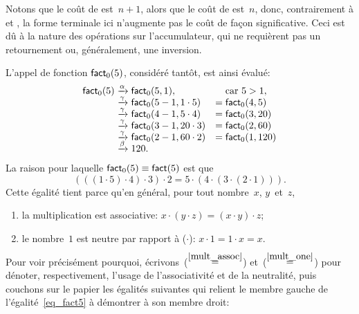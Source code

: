 Notons que le coût de  est~\(n+1\), alors que le
coût de  est~\(n\), donc, contrairement à
 et , la forme terminale ici n'augmente
pas le coût de façon significative. Ceci est dû à la nature des
opérations sur l'accumulateur, qui ne requièrent pas un retournement
ou, généralement, une inversion.

L'appel de fonction \(\textsf{fact}_0(5)\), considéré tantôt, est ainsi
évalué:
\begin{equation*}
\begin{array}{r@{\;}c@{\;}lc@{\;}l}
\fun{fact}_0(5)
& \xrightarrow{\smash[t]{\alpha}} & \fun{fact}_0(5,1), 
&& \text{car \(5 > 1\)},\\
& \xrightarrow{\smash[t]{\gamma}} & \fun{fact}_0(5-1,1 \cdot 5)
& = & \fun{fact}_0(4,5)\\
& \xrightarrow{\smash[t]{\gamma}} & \fun{fact}_0(4-1,5 \cdot 4)
& = & \fun{fact}_0(3,20)\\
& \xrightarrow{\smash[t]{\gamma}} & \fun{fact}_0(3-1,20 \cdot 3)
& = & \fun{fact}_0(2,60)\\
& \xrightarrow{\smash[t]{\gamma}} & \fun{fact}_0(2-1,60 \cdot 2)
& = & \fun{fact}_0(1,120)\\
& \xrightarrow{\smash[t]{\beta}} & 120.
\end{array}
\end{equation*}
La raison pour laquelle \(\textsf{fact}_0(5) \equiv \textsf{fact}(5)\) est
que
\begin{equation}
  (((1 \cdot 5) \cdot 4) \cdot 3) \cdot 2
= 5 \cdot (4 \cdot (3 \cdot (2 \cdot 1))).\label{eq_fact5}
\end{equation}
Cette égalité tient parce qu'en général, pour tout nombre~\(x\), \(y\)~et~\(z\),
\begin{enumerate}

\item \label{mult_assoc} la multiplication est associative: \(x \cdot
  (y \cdot z) = (x \cdot y) \cdot z\);

\item \label{mult_one} le nombre~\(1\) est neutre par rapport à
  (\(\cdot\)): \(x \cdot 1 = 1 \cdot x = x\).

\end{enumerate}
Pour voir précisément pourquoi, écrivons~(\(\mathrel{\stackrel{\smash{\ref{mult_assoc}}}{=}}\))
et~(\(\mathrel{\stackrel{\smash{\ref{mult_one}}}{=}}\)) pour dénoter, respectivement, l'usage de
l'associativité et de la neutralité, puis couchons sur le papier les
égalités suivantes qui relient le membre gauche de
l'égalité~\eqref{eq_fact5} à démontrer à son membre droit:
